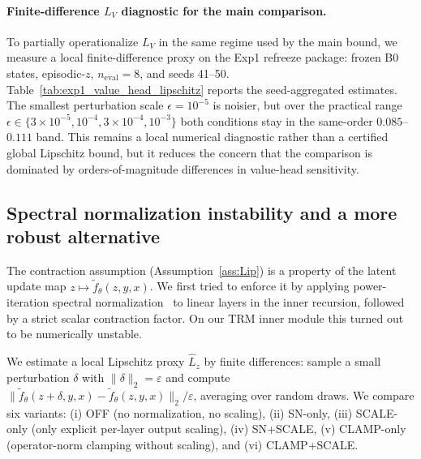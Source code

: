 \documentclass{article}
\theoremstyle{plain}
\theoremstyle{definition}
\theoremstyle{remark}
\begin{document}
\paragraph{Finite-difference $L_V$ diagnostic for the main comparison.}
To partially operationalize $L_V$ in the same regime used by the main bound, we measure a local finite-difference proxy on the Exp1 refreeze package: frozen B0 states, episodic-$z$, $n_{\mathrm{eval}}{=}8$, and seeds 41--50. Table~\ref{tab:exp1_value_head_lipschitz} reports the seed-aggregated estimates. The smallest perturbation scale $\epsilon=10^{-5}$ is noisier, but over the practical range $\epsilon\in\{3\times 10^{-5}, 10^{-4}, 3\times 10^{-4}, 10^{-3}\}$ both conditions stay in the same-order $0.085$--$0.111$ band. This remains a local numerical diagnostic rather than a certified global Lipschitz bound, but it reduces the concern that the comparison is dominated by orders-of-magnitude differences in value-head sensitivity.



\subsection{Spectral normalization instability and a more robust alternative}
\label{app:sn_instability}
The contraction assumption (Assumption~\ref{ass:Lip}) is a property of the latent update map $z\mapsto \tilde f_\theta(z,y,x)$.
We first tried to enforce it by applying power-iteration spectral normalization~\citep{Miyato2018} to linear layers in the inner recursion, followed by a strict scalar contraction factor.
On our TRM inner module this turned out to be numerically unstable.

We estimate a local Lipschitz proxy $\hat L_z$ by finite differences:
sample a small perturbation $\delta$ with $\|\delta\|_2=\varepsilon$ and compute
$\|\tilde f_\theta(z+\delta,y,x)-\tilde f_\theta(z,y,x)\|_2/\varepsilon$, averaging over random draws.
We compare six variants: (i) OFF (no normalization, no scaling), (ii) SN-only, (iii) SCALE-only (only explicit per-layer output scaling),
(iv) SN+SCALE, (v) CLAMP-only (operator-norm clamping without scaling), and (vi) CLAMP+SCALE.
\end{document}
